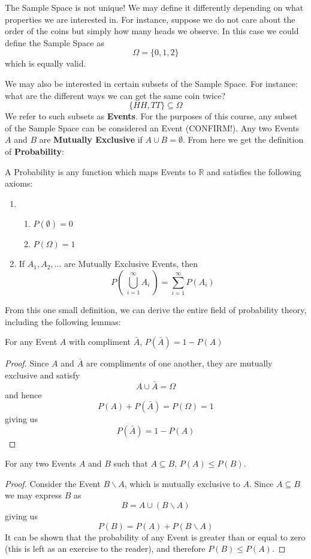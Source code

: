 \documentclass{report}
\begin{document}
\begin{notsofast}
The Sample Space is not unique! We may define it differently depending on what properties we are interested in. For instance, suppose we do not care about the order of the coins but simply how many heads we observe. In this case we could define the Sample Space as
\[
    \Omega=\{0,1,2\}
\]
which is equally valid.
\end{notsofast}
We may also be interested in certain subsets of the Sample Space. For instance: what are the different ways we can get the same coin twice?
\[
    \{HH,TT\}\subseteq \Omega
\]
We refer to such subsets as \textbf{Events}. For the purposes of this course, any subset of the Sample Space can be considered an Event (\todo CONFIRM!). Any two Events $A$ and $B$ are \textbf{Mutually Exclusive} if $A\cup B=\emptyset$. From here we get the definition of \textbf{Probability}:
\begin{definition}[Probability]
A Probability is any function which maps Events to $\mathbb R$ and satisfies the following axioms:
\begin{enumerate}
    \item 
    \begin{enumerate}
        \item $P(\emptyset) = 0$
        \item $P(\Omega)=1$
    \end{enumerate}
    \item If $A_1, A_2,...$ are Mutually Exclusive Events, then
    \[
        P\left(\ \bigcup_{i=1}^\infty A_i\ \right) = \sum_{i=1}^\infty P(A_i)
    \]
\end{enumerate}
\end{definition}
\label{def:probability}
From this one small definition, we can derive the entire field of probability theory, including the following lemmas:

\begin{lemma}
    For any Event $A$ with compliment $\bar A$, $P(\bar A)=1-P(A)$
\begin{proof}
    Since $A$ and $\bar A$ are compliments of one another, they are mutually exclusive and satisfy
    \[
        A\cup \bar A = \Omega
    \]
    and hence
    \[
        P(A)+P(\bar A) = P(\Omega) = 1
    \]
    giving us
    \[
        P(\bar A)=1-P(A)
    \]
\end{proof}
\end{lemma}

\begin{lemma}
    For any two Events $A$ and $B$ such that $A\subseteq B$, $P(A)\le P(B)$.
    
    \begin{proof}
    Consider the Event $B\backslash A$, which is mutually exclusive to $A$. Since $A\subseteq B$ we may express $B$ as
    \[
        B=A\cup (B\backslash A)
    \]
    giving us
    \[
        P(B)=P(A)+P(B\backslash A)
    \]
    It can be shown that the probability of any Event is greater than or equal to zero (this is left as an exercise to the reader), and therefore $P(B)\le P(A)$.
    \end{proof}
\end{lemma}
\end{document}
